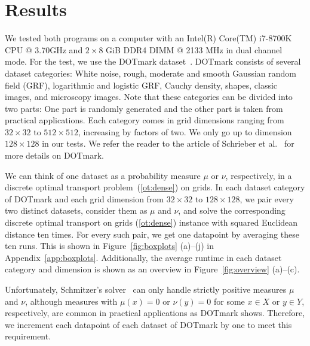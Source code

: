 \documentclass[a4paper,UKenglish,cleveref, autoref, thm-restate]{lipics-v2021}
\begin{document}
\section{Results}\label{sec:res}
We tested both programs on a computer with an Intel(R) Core(TM) i7-8700K CPU @ 3.70GHz and $2 \times 8$ GiB DDR4 DIMM @ 2133 MHz in dual channel mode.
For the test, we use the DOTmark dataset~\cite{schrieber2017dotmark}.
DOTmark consists of several dataset categories: White noise, rough, moderate and smooth Gaussian random field (GRF), logarithmic and logistic GRF, Cauchy density, shapes, classic images, and microscopy images.
Note that these categories can be divided into two parts: One part is randomly generated and the other part is taken from practical applications.
Each category comes in grid dimensions ranging from $32 \times 32$ to $512 \times 512$, increasing by factors of two.
We only go up to dimension $128 \times 128$ in our tests.
We refer the reader to the article of Schrieber et al.~\cite{schrieber2017dotmark} for more details on DOTmark.

We can think of one dataset as a probability measure $\mu$ or $\nu$, respectively, in a discrete optimal transport problem~(\ref{ot:dense}) on grids.
In each dataset category of DOTmark and each grid dimension from $32 \times 32$ to $128 \times 128$, we pair every two distinct datasets, consider them as $\mu$ and $\nu$, and solve the corresponding discrete optimal transport on grids (\ref{ot:dense}) instance with squared Euclidean distance ten times.
For every such pair, we get one datapoint by averaging these ten runs.
This is shown in Figure~\ref{fig:boxplots} (a)--(j) in Appendix~\ref{app:boxplots}.
Additionally, the average runtime in each dataset category and dimension is shown as an overview in Figure~\ref{fig:overview} (a)--(c).

Unfortunately, Schmitzer's solver~\cite{schmitzer2016sparse} can only handle strictly positive measures $\mu$ and $\nu$, although measures with $\mu(x)=0$ or $\nu(y)=0$ for some $x \in X$ or $y \in Y$, respectively, are common in practical applications as DOTmark shows.
Therefore, we increment each datapoint of each dataset of DOTmark by one to meet this requirement.
\end{document}
